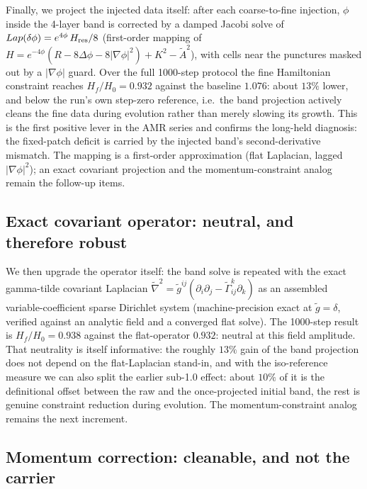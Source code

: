 Finally, we project the injected data itself: after each
coarse-to-fine injection, $\phi$ inside the 4-layer band is corrected
by a damped Jacobi solve of $Lap(\delta\phi) =
e^{4\phi}\,H_{\rm res}/8$ (first-order mapping of
$H = e^{-4\phi}(R - 8\Delta\phi - 8|\nabla\phi|^2) + K^2 - \tilde A^2$),
with cells near the punctures masked out by a
$|\nabla\phi|$ guard. Over the full 1000-step protocol the fine
Hamiltonian constraint reaches $H_f/H_0 = 0.932$ against the
baseline $1.076$: about $13\%$ lower, and below the run's own
step-zero reference, i.e.\ the band projection actively cleans the
fine data during evolution rather than merely slowing its growth.
This is the first positive lever in the AMR series and confirms the
long-held diagnosis: the fixed-patch deficit is carried by the
injected band's second-derivative mismatch. The mapping is a
first-order approximation (flat Laplacian, lagged $|\nabla\phi|^2$);
an exact covariant projection and the momentum-constraint analog
remain the follow-up items.

\subsection{Exact covariant operator: neutral, and therefore
robust}

We then upgrade the operator itself: the band solve is repeated with
the exact gamma-tilde covariant Laplacian
$\tilde\nabla^2 = \tilde g^{ij}(\partial_i\partial_j -
\tilde\Gamma^k_{ij}\partial_k)$ as an assembled variable-coefficient
sparse Dirichlet system (machine-precision exact at $\tilde g = \delta$,
verified against an analytic field and a converged flat solve).
The 1000-step result is $H_f/H_0 = 0.938$ against the flat-operator
$0.932$: neutral at this field amplitude. That neutrality is itself
informative: the roughly $13\%$ gain of the band projection does not
depend on the flat-Laplacian stand-in, and with the iso-reference
measure we can also split the earlier sub-1.0 effect: about $10\%$ of
it is the definitional offset between the raw and the once-projected
initial band, the rest is genuine constraint reduction during
evolution. The momentum-constraint analog remains the next increment.

\subsection{Momentum correction: cleanable, and not the carrier}


